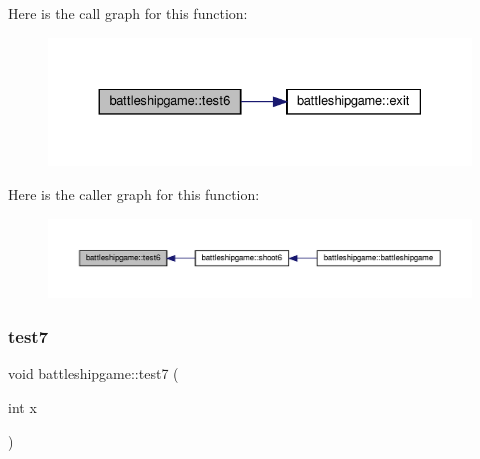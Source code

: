 Here is the call graph for this function\+:
\nopagebreak
\begin{figure}[H]
\begin{center}
\leavevmode
\includegraphics[width=330pt]{classbattleshipgame_a15ad12d526ba36f2b951aca9005ec6f6_cgraph}
\end{center}
\end{figure}
Here is the caller graph for this function\+:
\nopagebreak
\begin{figure}[H]
\begin{center}
\leavevmode
\includegraphics[width=350pt]{classbattleshipgame_a15ad12d526ba36f2b951aca9005ec6f6_icgraph}
\end{center}
\end{figure}
\mbox{\label{classbattleshipgame_a04531484e5ac0cb61328e6a07f6bbe3b}} 
\subsubsection{\texorpdfstring{test7}{test7}}
{\footnotesize\ttfamily void battleshipgame\+::test7 (\begin{DoxyParamCaption}\item[{int}]{x }\end{DoxyParamCaption})\hspace{0.3cm}{\ttfamily [slot]}}

